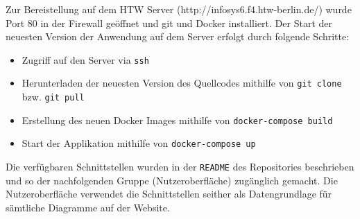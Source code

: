 Zur Bereistellung auf dem HTW Server (http://infosys6.f4.htw-berlin.de/) wurde Port 80 in der Firewall geöffnet und git und Docker installiert.
Der Start der neuesten Version der Anwendung auf dem Server erfolgt durch folgende Schritte:
\begin{itemize}
  \item Zugriff auf den Server via \lstinline{ssh}
  \item Herunterladen der neuesten Version des Quellcodes mithilfe von \lstinline{git clone} bzw. \lstinline{git pull}
  \item Erstellung des neuen Docker Images mithilfe von \lstinline{docker-compose build}
  \item Start der Applikation mithilfe von \lstinline{docker-compose up}
\end{itemize}

Die verfügbaren Schnittstellen wurden in der \lstinline{README} des Repositories beschrieben und so der nachfolgenden Gruppe (Nutzeroberfläche) zugänglich gemacht.
Die Nutzeroberfläche verwendet die Schnittstellen seither als Datengrundlage für sämtliche Diagramme auf der Website.
